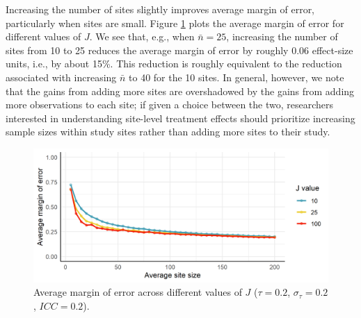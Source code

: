 \documentclass[]{article}
\begin{document}
Increasing the number of sites slightly improves average margin of error, particularly when sites are small.
Figure \ref{fig:results_J} plots the average margin of error for different values of $J$.
We see that, e.g., when $\bar{n}=25$, increasing the number of sites from 10 to 25 reduces the average margin of error by roughly 0.06 effect-size units, i.e., by about 15\%.
This reduction is roughly equivalent to the reduction associated with increasing $\bar{n}$ to 40 for the 10 sites.
In general, however, we note that the gains from adding more sites are overshadowed by the gains from adding more observations to each site;
if given a choice between the two, researchers interested in understanding site-level treatment effects should prioritize increasing sample sizes within study sites rather than adding more sites to their study.
\begin{figure}[ht]
	\centering
	\includegraphics[width=\textwidth]{simstudy_J_length}
	\caption{Average margin of error across different values of $J$ ($\tau=0.2$, $\sigma_\tau=0.2$, $ICC=0.2$).}
	\label{fig:results_J}
\end{figure}
\end{document}
